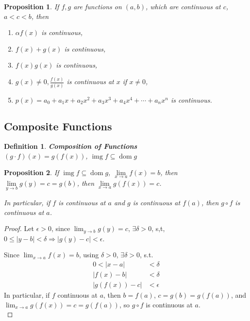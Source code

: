 \documentclass[12pt]{article}
\newcommand{\abs}[1]{\left| #1 \right|}
\theoremstyle{plain}
\newtheorem{definition}{Definition}[subsection]
\newtheorem{proposition}{Proposition}[subsection]
\newcommand{\dlim}{\displaystyle\lim\limits}
\DeclareMathOperator{\Dom}{dom}
\DeclareMathOperator{\Img}{img}
\begin{document}
    \begin{proposition}
        If $f, g$ are functions on $(a,b)$, which are continuous at $c$, 
        $a<c<b$, then
        \begin{enumerate}
            \item $\alpha f(x)$ is continuous,
            \item $f(x)+g(x)$ is continuous,
            \item $f(x)g(x)$ is continuous,
            \item $g(x)\neq 0, 
            	\frac{f(x)}{g(x)}$ is continuous at $x$ if $x\neq 0$,
            \item $p(x) = a_0+a_1x+a_2x^2+a_3x^3+a_4x^4+\cdots+a_nx^n$
            	is continuous.\\
        \end{enumerate}
    \end{proposition}


\newpage
	\subsection{Composite Functions}
    \begin{definition}{\textbf{Composition of Functions}}\\
    $(g\cdot f)(x)=g(f(x))$, $\Img f \subseteq \Dom  g$\\
    \end{definition}

    \begin{proposition}
        If $\Img f \subseteq \Dom g$, $\dlim_{x\to a} f(x) = b$, 
        then $\dlim_{y\to b}g(y) = c = g(b)$, then $\dlim_{x\to a} g(f(x))=c$.
        
        In particular, if $f$ is continuous at $a$ and $g$ is continuous at $f(a)$,
        then $g \circ f$ is continuous at $a$.
    \end{proposition}

    \begin{proof}
        Let $\epsilon > 0$, since $\lim_{y\to b} g(y)=c$, $\exists \delta >0$,
        s,t, $0\leq \abs{y-b}<\delta \Rightarrow\abs{g(y)-c}<\epsilon$.

        Since $\lim_{x\to a} f(x) = b$, using $\delta > 0$, $\exists \delta > 0$,
        s.t. 
        \begin{align*}
            0<\abs{x-a}&<\delta\\
            \abs{f(x)-b}&<\delta\\
            \abs{g(f(x))-c}&<\epsilon
        \end{align*}
        In particular, if $f$ continuous at $a$, then $b=f(a)$, $c=g(b)=g(f(a))$,
        and $\lim_{x\to a} g(f(x))=c=g(f(a))$, so $g\circ f$ is continuous at $a$.\\
    \end{proof}
\end{document}
